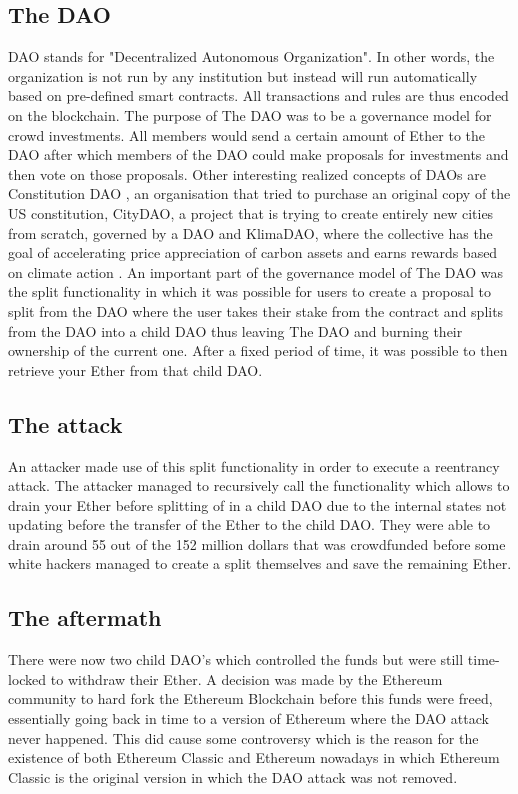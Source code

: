 \documentclass[sigconf]{acmart}
\begin{document}
\subsection{The DAO}
 DAO stands for "Decentralized Autonomous Organization". In other words, the organization is not run by any institution but instead will run automatically based on pre-defined smart contracts. All transactions and rules are thus encoded on the blockchain. The purpose of The DAO was to be a governance model for crowd investments. All members would send a certain amount of Ether to the DAO after which members of the DAO could make proposals for investments and then vote on those proposals. Other interesting realized concepts of DAOs are Constitution DAO \cite{constitution}, an organisation that tried to purchase an original copy of the US constitution, CityDAO, a project that is trying to create entirely new cities from scratch, governed by a DAO \cite{citydao} \cite{cryptocities} and KlimaDAO, where the collective has the goal of accelerating price appreciation of carbon assets and earns rewards based on climate action \cite{klimadao}. 
 An important part of the governance model of The DAO was the split functionality in which it was possible for users to create a proposal to split from the DAO where the user takes their stake from the contract and splits from the DAO into a child DAO thus leaving The DAO and burning their ownership of the current one. After a fixed period of time, it was possible to then retrieve your Ether from that child DAO. 
 
\subsection{The attack}
An attacker made use of this split functionality in order to execute a reentrancy attack. The attacker managed to recursively call the functionality which allows to drain your Ether before splitting of in a child DAO due to the internal states not updating before the transfer of the Ether to the child DAO. They were able to drain around 55 out of the 152 million dollars that was crowdfunded before some white hackers managed to create a split themselves and save the remaining Ether. 

\subsection{The aftermath}
There were now two child DAO's which controlled the funds but were still time-locked to withdraw their Ether. A decision was made by the Ethereum community to hard fork the Ethereum Blockchain before this funds were freed, essentially going back in time to a version of Ethereum where the DAO attack never happened. This did cause some controversy which is the reason for the existence of both Ethereum Classic and Ethereum nowadays in which Ethereum Classic is the original version in which the DAO attack was not removed.
\end{document}
